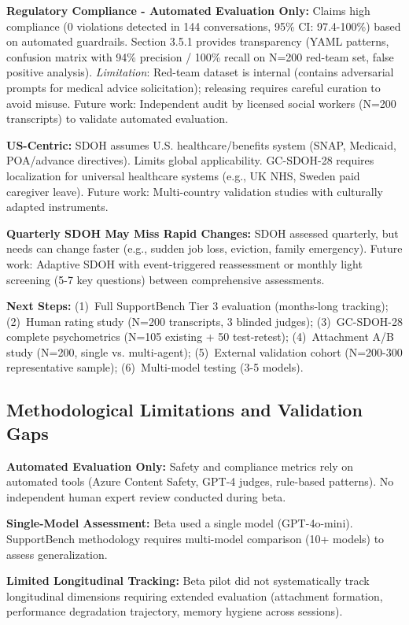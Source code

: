 \documentclass{article}
\begin{document}
\textbf{Regulatory Compliance - Automated Evaluation Only:} Claims high compliance (0 violations detected in 144 conversations, 95\% CI: 97.4-100\%) based on automated guardrails. Section 3.5.1 provides transparency (YAML patterns, confusion matrix with 94\% precision / 100\% recall on N=200 red-team set, false positive analysis). \textit{Limitation}: Red-team dataset is internal (contains adversarial prompts for medical advice solicitation); releasing requires careful curation to avoid misuse. Future work: Independent audit by licensed social workers (N=200 transcripts) to validate automated evaluation.

\textbf{US-Centric:} SDOH assumes U.S. healthcare/benefits system (SNAP, Medicaid, POA/advance directives). Limits global applicability. GC-SDOH-28 requires localization for universal healthcare systems (e.g., UK NHS, Sweden paid caregiver leave). Future work: Multi-country validation studies with culturally adapted instruments.

\textbf{Quarterly SDOH May Miss Rapid Changes:} SDOH assessed quarterly, but needs can change faster (e.g., sudden job loss, eviction, family emergency). Future work: Adaptive SDOH with event-triggered reassessment or monthly light screening (5-7 key questions) between comprehensive assessments.

\textbf{Next Steps:} (1)~Full SupportBench Tier 3 evaluation (months-long tracking); (2)~Human rating study (N=200 transcripts, 3 blinded judges); (3)~GC-SDOH-28 complete psychometrics (N=105 existing + 50 test-retest); (4)~Attachment A/B study (N=200, single vs. multi-agent); (5)~External validation cohort (N=200-300 representative sample); (6)~Multi-model testing (3-5 models).

%
\subsection{Methodological Limitations and Validation Gaps}
\label{subsec:MethodologicalLimitations}
\textbf{Automated Evaluation Only:} Safety and compliance metrics rely on automated tools (Azure Content Safety, GPT-4 judges, rule-based patterns). No independent human expert review conducted during beta.

\textbf{Single-Model Assessment:} Beta used a single model (GPT-4o-mini). SupportBench methodology requires multi-model comparison (10+ models) to assess generalization.

\textbf{Limited Longitudinal Tracking:} Beta pilot did not systematically track longitudinal dimensions requiring extended evaluation (attachment formation, performance degradation trajectory, memory hygiene across sessions).
\end{document}
